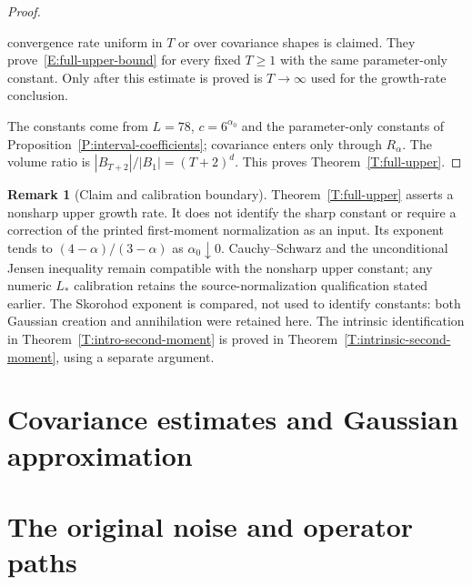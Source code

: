 \documentclass[12pt,oneside,openany]{book}
\numberwithin{equation}{section}
\theoremstyle{nogostyle}
\theoremstyle{definition}
\newtheorem{remark}[theorem]{Remark}
\begin{document}
\begin{proof}
\begin{enumerate}[(i)]
      convergence rate uniform in $T$ or over covariance shapes is claimed. They
      prove~\eqref{E:full-upper-bound} for every fixed $T \ge 1$ with the same
      parameter-only constant. Only after this estimate is proved is $T \to
      \infty$ used for the growth-rate conclusion.
  \end{enumerate}
  The constants come from $L = 78$, $c = 6^{\alpha_0}$ and the parameter-only
  constants of Proposition~\ref{P:interval-coefficients}; covariance enters only
  through $R_\alpha$. The volume ratio is $|B_{T+2}|/|B_1| = (T+2)^d$. This
  proves Theorem~\ref{T:full-upper}.
\end{proof}



\begin{remark}[Claim and calibration boundary]\label{R:full-upper-boundary}
  Theorem~\ref{T:full-upper} asserts a nonsharp upper growth rate. It does not
  identify the sharp constant or require a correction of the printed
  first-moment normalization as an input. Its exponent tends to
  $(4-\alpha)/(3-\alpha)$ as $\alpha_0\downarrow0$. Cauchy--Schwarz and the
  unconditional Jensen inequality remain compatible with the nonsharp upper
  constant; any numeric $L_*$ calibration retains the source-normalization
  qualification stated earlier. The Skorohod exponent is compared, not used to
  identify constants: both Gaussian creation and annihilation were retained
  here. The intrinsic identification in Theorem~\ref{T:intro-second-moment} is proved in
  Theorem~\ref{T:intrinsic-second-moment}, using a separate argument.
\end{remark}




\chapter{Covariance estimates and Gaussian approximation}\label{S:book-gaussian-foundations}









\chapter{The original noise and operator paths}\label{S:book-operator-paths}
\end{document}
